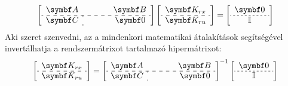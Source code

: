 \bgroup
{}
\def\arraystretch{1.2}
\begin{equation}
  \left[\begin{array}{ c : c }
      \rmat A & \phantom{\rmat A} \hspace{-2.8mm}\rmat B
      \\ \hdashline
      \rmat C & \phantom{\rmat A} \hspace{-2.5mm}\rmat 0
    \end{array}\right]
  \left[\begin{array}{ c }
      \rmat K_{rx}
      \\ \hdashline
      \rmat K_{ru}
    \end{array}\right]
  =
  \left[\begin{array}{ c }
      \rmat 0
      \\ \hdashline[2.25pt/2.25pt]
      \Imat
    \end{array}\right]
\end{equation}
\egroup
Aki szeret szenvedni, az a mindenkori matematikai átalakítások segítségével
invertálhatja a rendszermátrixot tartalmazó hipermátrixot:
\bgroup
{}
\def\arraystretch{1.2}
\begin{equation}
  \left[\begin{array}{ c }
      \rmat K_{rx}
      \\ \hdashline
      \rmat K_{ru}
    \end{array}\right]
  =
  \left[\begin{array}{ c : c }
      \rmat A & \phantom{\rmat A} \hspace{-2.8mm}\rmat B
      \\ \hdashline
      \rmat C & \phantom{\rmat A} \hspace{-2.5mm}\rmat 0
    \end{array}\right]^{-1}
  \left[\begin{array}{ c }
      \rmat 0
      \\ \hdashline[2.25pt/2.25pt]
      \Imat
    \end{array}\right]
\end{equation}
\egroup

\clearpage
